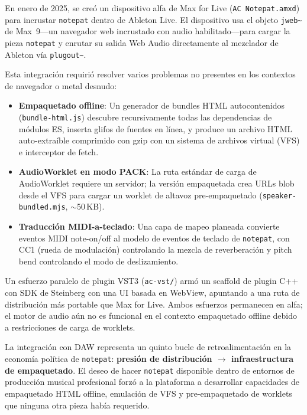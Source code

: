 \documentclass[10pt,letterpaper,twocolumn]{article}
\begin{document}
En enero de 2025, se creó un dispositivo alfa de Max for Live (\texttt{AC Notepat.amxd}) para incrustar \texttt{notepat} dentro de Ableton Live. El dispositivo usa el objeto \texttt{jweb\textasciitilde} de Max~9---un navegador web incrustado con audio habilitado---para cargar la pieza \texttt{notepat} y enrutar su salida Web Audio directamente al mezclador de Ableton vía \texttt{plugout\textasciitilde}.

Esta integración requirió resolver varios problemas no presentes en los contextos de navegador o metal desnudo:

\begin{itemize}
  \item \textbf{Empaquetado offline}: Un generador de bundles HTML autocontenidos (\texttt{bundle-html.js}) descubre recursivamente todas las dependencias de módulos ES, inserta glifos de fuentes en línea, y produce un archivo HTML auto-extraíble comprimido con gzip con un sistema de archivos virtual (VFS) e interceptor de fetch.
  \item \textbf{AudioWorklet en modo PACK}: La ruta estándar de carga de AudioWorklet requiere un servidor; la versión empaquetada crea URLs blob desde el VFS para cargar un worklet de altavoz pre-empaquetado (\texttt{speaker-bundled.mjs}, $\sim$50\,KB).
  \item \textbf{Traducción MIDI-a-teclado}: Una capa de mapeo planeada convierte eventos MIDI note-on/off al modelo de eventos de teclado de \texttt{notepat}, con CC1 (rueda de modulación) controlando la mezcla de reverberación y pitch bend controlando el modo de deslizamiento.
\end{itemize}

Un esfuerzo paralelo de plugin VST3 (\texttt{ac-vst/}) armó un scaffold de plugin C++ con SDK de Steinberg con una UI basada en WebView, apuntando a una ruta de distribución más portable que Max for Live. Ambos esfuerzos permanecen en alfa; el motor de audio aún no es funcional en el contexto empaquetado offline debido a restricciones de carga de worklets.

La integración con DAW representa un quinto bucle de retroalimentación en la economía política de \texttt{notepat}: \textbf{presión de distribución $\rightarrow$ infraestructura de empaquetado}. El deseo de hacer \texttt{notepat} disponible dentro de entornos de producción musical profesional forzó a la plataforma a desarrollar capacidades de empaquetado HTML offline, emulación de VFS y pre-empaquetado de worklets que ninguna otra pieza había requerido.
\end{document}
